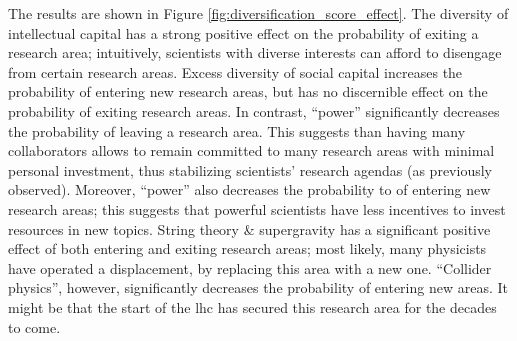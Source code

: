 \documentclass{article}
\begin{document}

The results are shown in Figure \ref{fig:diversification_score_effect}. The diversity of intellectual capital has a strong positive effect on the probability of exiting a research area; intuitively, scientists with diverse interests can afford to disengage from certain research areas. Excess diversity of social capital increases the probability of entering new research areas, but has no discernible effect on the probability of exiting research areas. In contrast, ``power'' significantly decreases the probability of leaving a research area. This suggests than having many collaborators allows to remain committed to many research areas with minimal personal investment, thus stabilizing scientists' research agendas (as previously observed). Moreover, ``power'' also decreases the probability to of entering new research areas; this suggests that powerful scientists have less incentives to invest resources in new topics. String theory \& supergravity has a significant positive effect of both entering and exiting research areas; most likely, many physicists have operated a displacement, by replacing this area with a new one. ``Collider physics'', however, significantly decreases the probability of entering new areas. It might be that the start of the \gls{lhc} has secured this research area for the decades to come. %
\end{document}
